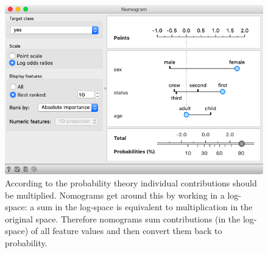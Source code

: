 \begin{figure}[h]
    \centering
    \includegraphics[scale=0.45]{nomogram.png}
    \caption{According to the probability theory individual contributions should be multiplied. Nomograms get around this by working in a log-space: a sum in the log-space is equivalent to multiplication in the original space. Therefore nomograms sum contributions (in the log-space) of all feature values and then convert them back to probability.}
\end{figure}

